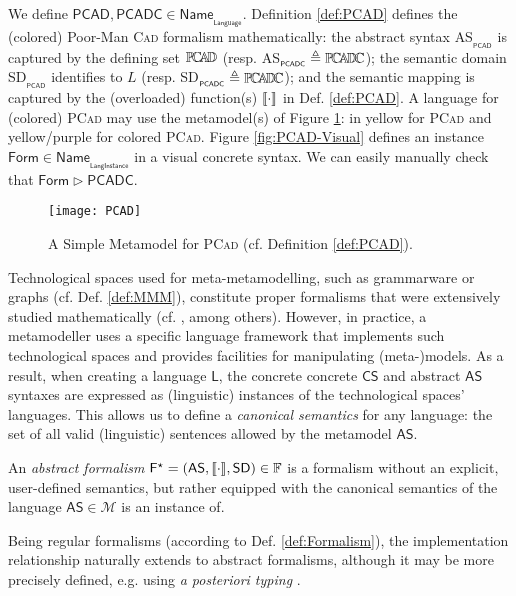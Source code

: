 \begin{Example}
      We define $\mathsf{PCAD, PCADC} \in 
\mathsf{Name}_{_{\mathsf{Language}}}$. Definition \ref{def:PCAD} defines the 
(colored) Poor-Man \textsc{Cad} formalism mathematically: the abstract syntax 
\textsf{AS}$_{_{\mathsf{PCAD}}}$ is captured by the defining set $\mathbb{P}\!\mathbb{C}\!\mathbb{A}\!\mathbb{D} $ (resp. 
\textsf{AS}$_{_{\mathsf{PCADC}}} \triangleq \mathbb{P}\!\mathbb{C}\!\mathbb{A}\!\mathbb{D} \!\mathbb{C} $); the semantic domain 
\textsf{SD}$_{_{\mathsf{PCAD}}}$ identifies to $L$ (resp. 
\textsf{SD}$_{_{\mathsf{PCADC}}} \triangleq \mathbb{P}\!\mathbb{C}\!\mathbb{A}\!\mathbb{D} \!\mathbb{C} $); and the semantic mapping is 
captured by the (overloaded) function(s) $\llbracket \cdot \rrbracket$ in Def. \ref{def:PCAD}. A 
language for (colored) \textsc{PCad} may use the metamodel(s) of Figure 
\ref{fig:PCAD-MM}: in yellow for \textsc{PCad} and yellow/purple for colored 
\textsc{PCad}. Figure \ref{fig:PCAD-Visual} defines an instance 
$\mathsf{Form}\in\mathsf{Name}_{_{\mathsf{LangInstance}}}$ in a visual concrete 
syntax. We can easily manually check that $\mathsf{Form}\rhd \mathsf{PCADC}$.

\begin{figure}[t]
   \centering
   \texttt{[image: PCAD]}
   \caption{A Simple Metamodel for \textsc{PCad} (cf. Definition 
\ref{def:PCAD}).}%
   \label{fig:PCAD-MM}%
\end{figure}
\end{Example}


Technological spaces used for meta-metamodelling, such as grammarware or 
graphs (cf. Def. \ref{def:MMM}), constitute proper formalisms that were 
extensively studied mathematically (cf. 
\cite{B:Rozenberg:1997,B:Aho-etAl:2006}, 
among others). However, in practice, a metamodeller uses a specific language 
framework that implements such technological spaces and provides facilities for 
manipulating (meta-)models. As a result, when creating a language $\mathsf{L}$,
the concrete concrete $\mathsf{CS}$ and abstract $\mathsf{AS}$ syntaxes are 
expressed as (linguistic) instances of the technological spaces' languages. 
This allows us to define a \emph{canonical semantics} for any language: the set 
of all valid (linguistic) sentences allowed by the metamodel $\mathsf{AS}$. 

\begin{Definition}
   An \emph{abstract formalism} $\mathsf{F^\star} = 
(\mathsf{AS}, \llbracket \cdot \rrbracket, \mathsf{SD}) \in\mathbb{F}$ is a formalism without an 
explicit, user-defined semantics, but rather equipped with the canonical 
semantics of the language $\mathsf{AS}\in\mathcal{M}$ is an instance of.
\end{Definition}
Being regular formalisms (according to Def. \ref{def:Formalism}), the 
implementation relationship naturally extends to abstract formalisms, although 
it may be more precisely defined, e.g. using \emph{a posteriori typing} 
\cite{J:deLara-Guerra:2017}.

